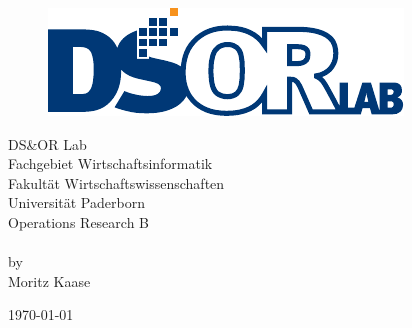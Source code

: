 \begin{titlepage}
\begin{figure}[H]
\centering
	\includegraphics[scale=0.8]{dsorlogo}
\end{figure}
\begin{center}
DS\&OR Lab\\
Fachgebiet Wirtschaftsinformatik\\
Fakultät Wirtschaftswissenschaften\\
Universität Paderborn\\     
\vspace{8ex}
\Large
Operations Research B\\
\vspace{8ex}
\textbf{}
\vspace{6ex}
\normalsize
\\by\\
Moritz Kaase\\
\vspace{8ex}

\normalsize
\vspace{16ex}
\today
\end{center}
\end{titlepage}
